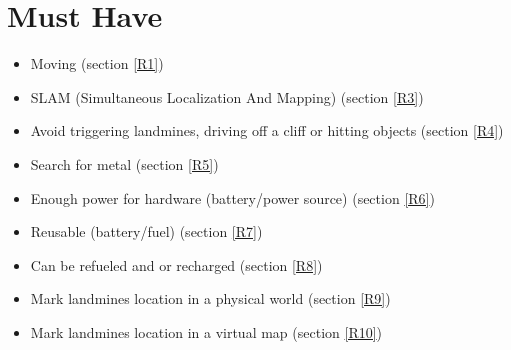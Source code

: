 \section*{Must Have}
\begin{itemize}

    \vspace{-3.5mm}

\item Moving (section \ref{R1})

    \vspace{-3.5mm}

\item SLAM (Simultaneous Localization And Mapping) (section \ref{R3})

    \vspace{-3.5mm}

\item Avoid triggering landmines, driving off a cliff or hitting objects (section \ref{R4})

    \vspace{-3.5mm}

\item Search for metal  (section \ref{R5})

    \vspace{-3.5mm}

\item Enough power for hardware (battery/power source)  (section \ref{R6})

    \vspace{-3.5mm}

\item Reusable (battery/fuel)  (section \ref{R7})

    \vspace{-3.5mm}

\item Can be refueled and or recharged  (section \ref{R8})

    \vspace{-3.5mm}

\item Mark landmines location in a physical world  (section \ref{R9})

    \vspace{-3.5mm}

\item Mark landmines location in a virtual map  (section \ref{R10})
\end{itemize}

\vspace{-2mm}

